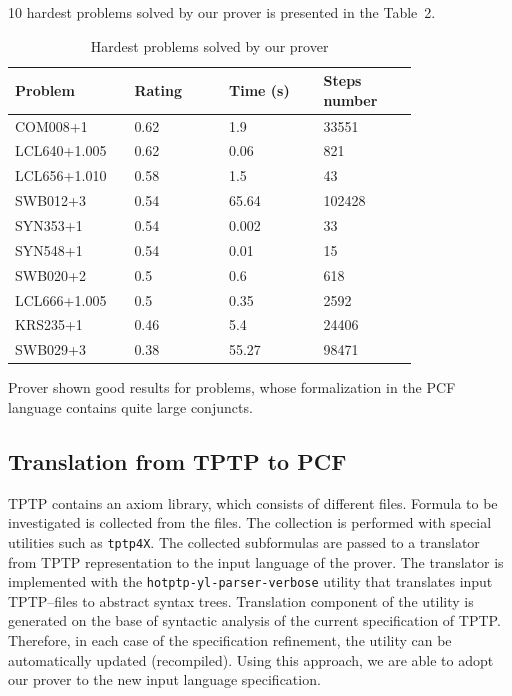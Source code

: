 \documentclass[runningheads,a4paper]{llncs}
\begin{document}
10 hardest problems solved by our prover is presented in the Table~2.
\begin{table}
\caption{Hardest problems solved by our prover}
\begin{tabular}{|p{0.2\linewidth}|p{0.2\linewidth}|p{0.2\linewidth}|p{0.2\linewidth}|}

\hline
\textbf{Problem} & \textbf{Rating} & \textbf{Time (s)} & \textbf{Steps number} \\
\hline
COM008+1 & 0.62 & 1.9 & 33551 \\
\hline
LCL640+1.005 &  0.62 &  0.06 &  821 \\
\hline
LCL656+1.010 &  0.58 &  1.5 &  43 \\
\hline
SWB012+3 &  0.54 &  65.64 &  102428 \\
\hline
SYN353+1 &  0.54 &  0.002 &  33 \\
\hline
SYN548+1 &  0.54 &  0.01 &  15 \\
\hline
SWB020+2 &  0.5 &  0.6 &  618 \\
\hline
LCL666+1.005 &  0.5 &  0.35 &  2592 \\
\hline
KRS235+1 & 0.46 & 5.4 & 24406 \\
\hline
SWB029+3 &  0.38 &  55.27 &  98471 \\
\hline
\end{tabular}
\end{table}


Prover shown good results for problems, whose formalization in the PCF language contains quite large conjuncts.

\subsection{Translation from TPTP to PCF}
TPTP contains an axiom library, which consists of different files. Formula to be investigated is collected from the files. The collection is performed with special utilities such as \texttt{tptp4X}. The collected subformulas are passed to a translator from TPTP representation to the input language of the prover. The translator is implemented with the \texttt{hotptp-yl-parser-verbose} \cite{TPTPTrans} utility that translates input TPTP--files to abstract syntax trees. Translation component of the utility is generated on the base of syntactic analysis of the current specification of TPTP. Therefore, in each case of the specification refinement, the utility can be automatically updated (recompiled). Using this approach, we are able to adopt our prover to the new input language specification.
\end{document}
